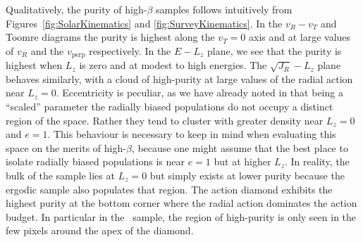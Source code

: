 Qualitatively, the purity of high-$\beta$ samples follows intuitively from Figures~\ref{fig:SolarKinematics} and \ref{fig:SurveyKinematics}. In the $v_{R}-v_{T}$ and Toomre diagrams the purity is highest along the $v_{T}=0$ axis and at large values of $v_{R}$ and the $v_\mathrm{perp}$ respectively. In the $E-L_{z}$ plane, we see that the purity is highest when $L_{z}$ is zero and at modest to high energies. The $\sqrt{J_{R}}-L_{z}$ plane behaves similarly, with a cloud of high-purity at large values of the radial action near $L_{z}=0$. Eccentricity is peculiar, as we have already noted in that being a ``scaled'' parameter the radially biased populations do not occupy a distinct region of the space. Rather they tend to cluster with greater density near $L_{z}=0$ and $e=1$. This behaviour is necessary to keep in mind when evaluating this space on the merits of high-$\beta$, because one might assume that the best place to isolate radially biased populations is near $e=1$ but at higher $L_{z}$. In reality, the bulk of the sample lies at $L_{z}=0$ but simply exists at lower purity because the ergodic sample also populates that region. The action diamond exhibits the highest purity at the bottom corner where the radial action dominates the action budget. In particular in the \solar\ sample, the region of high-purity is only seen in the few pixels around the apex of the diamond.

